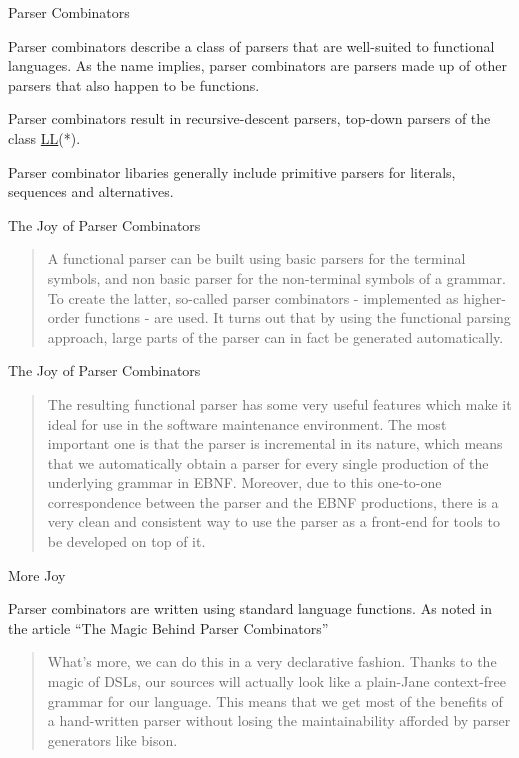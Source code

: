 \documentclass[presentation]{beamer}
\begin{document}
\begin{frame}{Parser Combinators}

  Parser combinators describe a class of parsers that are well-suited
  to functional languages. As the name implies, parser combinators are
  parsers made up of other parsers that also happen to be functions.

  Parser combinators result in recursive-descent parsers, top-down
  parsers of the class \href{http://en.wikipedia.org/wiki/LL_parser}{LL}(*).

  Parser combinator libaries generally include primitive parsers for
  literals, sequences and alternatives.

\end{frame}

\begin{frame}{The Joy of Parser Combinators}
\begin{quotation}
 A functional parser can be built using basic parsers for the terminal
 symbols, and non basic parser for the non-terminal symbols of a
 grammar. To create the latter, so-called parser combinators -
 implemented as higher-order functions - are used. It turns out that by
 using the functional parsing approach, large parts of the parser can
 in fact be generated automatically.
\end{quotation}
\end{frame}

\begin{frame}{The Joy of Parser Combinators}
\begin{quotation}
 The resulting functional parser has some very useful features which
 make it ideal for use in the software maintenance environment. The
 most important one is that the parser is incremental in its nature,
 which means that we automatically obtain a parser for every single
 production of the underlying grammar in EBNF. Moreover, due to this
 one-to-one correspondence between the parser and the EBNF productions,
 there is a very clean and consistent way to use the parser as a
 front-end for tools to be developed on top of it.\cite{Baumann}
\end{quotation}
\end{frame}

\begin{frame}{More Joy}

  Parser combinators are written using standard language functions. As
  noted in the article ``The Magic Behind Parser Combinators''\cite{Spiewak}

\begin{quotation}
  What's more, we can do this in a very declarative fashion.  Thanks
  to the magic of DSLs, our sources will actually look like a
  plain-Jane context-free grammar for our language.  This means that
  we get most of the benefits of a hand-written parser without losing
  the maintainability afforded by parser generators like bison.
\end{quotation}
\end{frame}
\end{document}
